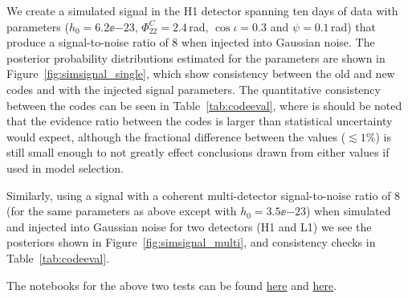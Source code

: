 We create a simulated signal in the H1 detector spanning ten days of data with parameters ($h_0 = 6.2\ee{-23}$, $\Phi_{22}^C = 2.4$\,rad, $\cos{\iota} = 0.3$
and $\psi = 0.1$\,rad) that produce a signal-to-noise ratio of 8 when injected into
Gaussian noise. The posterior probability distributions estimated for the parameters are shown in Figure~\ref{fig:simsignal_single}, which show consistency
between the old and new codes and with the injected signal parameters. The quantitative consistency between the codes can be seen in Table~\ref{tab:codeeval},
where is should be noted that the evidence ratio between the codes is larger than statistical uncertainty would expect, although the fractional difference between
the values ($\lesssim 1\%$) is still small enough to not greatly effect conclusions drawn from either values if used in model selection.

Similarly, using a signal with a coherent multi-detector signal-to-noise ratio of 8 (for the same parameters as above except with $h_0 = 3.5\ee{-23}$) when
simulated and injected into Gaussian noise for two detectors (H1
and L1) we see the posteriors shown in Figure~\ref{fig:simsignal_multi}, and consistency checks in Table~\ref{tab:codeeval}.

The notebooks for the above two tests can be found \href{https://github.com/mattpitkin/CW_nested_sampling_doc/blob/master/figures/codeeval/simulations/signal/SimulatedSignalTestsPaper.ipynb}{here} and 
\href{https://github.com/mattpitkin/CW_nested_sampling_doc/blob/master/figures/codeeval/simulations/signal_multidet/SimulatedSignalMultidetTestsPaper.ipynb}{here}.
